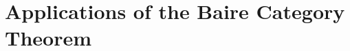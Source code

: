 \documentclass[../../main.tex]{subfiles}
\begin{document}
\chapter{Applications of the Baire Category Theorem}
\end{document}
